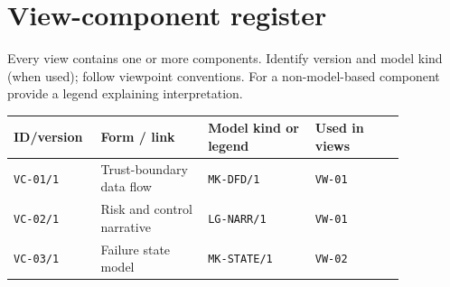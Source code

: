 \documentclass[11pt,letterpaper]{article}
\begin{document}
\section{View-component register \texorpdfstring{}{(6.8)}}
\begin{Requirement}\FlagReq{} Every view contains one or more components. Identify version and model kind (when used); follow viewpoint conventions. For a non-model-based component provide a legend explaining interpretation. \end{Requirement}
\begin{longtable}{p{0.15\linewidth}p{0.25\linewidth}p{0.25\linewidth}p{0.21\linewidth}}\toprule
\textbf{ID/version}&\textbf{Form / link}&\textbf{Model kind or legend}&\textbf{Used in views}\\\midrule\endhead
\texttt{VC-01/1}&Trust-boundary data flow&\texttt{MK-DFD/1}&\texttt{VW-01}\\
\texttt{VC-02/1}&Risk and control narrative&\texttt{LG-NARR/1}&\texttt{VW-01}\\
\texttt{VC-03/1}&Failure state model&\texttt{MK-STATE/1}&\texttt{VW-02}\\\bottomrule\end{longtable}
\end{document}
